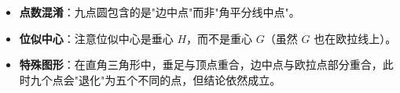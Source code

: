 \begin{trapbox}
\begin{itemize}
    \item \textbf{点数混淆}：九点圆包含的是"边中点"而非"角平分线中点"。
    \item \textbf{位似中心}：注意位似中心是垂心 $H$，而不是重心 $G$（虽然 $G$ 也在欧拉线上）。
    \item \textbf{特殊图形}：在直角三角形中，垂足与顶点重合，边中点与欧拉点部分重合，此时九个点会"退化"为五个不同的点，但结论依然成立。
\end{itemize}
\end{trapbox}